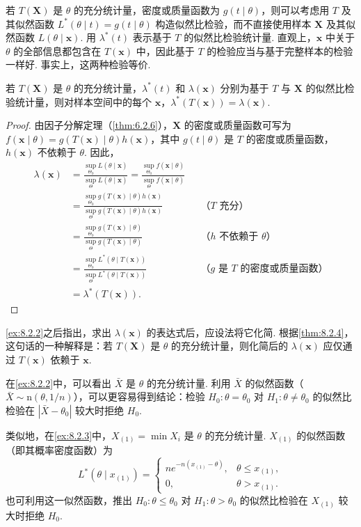 若 $T(\boldsymbol X)$ 是 $\theta$ 的充分统计量，密度或质量函数为 $g(t\mid\theta)$，则可以考虑用 $T$ 及其似然函数 $L^*(\theta\mid t)=g(t\mid\theta)$ 构造似然比检验，而不直接使用样本 $\boldsymbol X$ 及其似然函数 $L(\theta\mid\boldsymbol x)$. 用 $\lambda^*(t)$ 表示基于 $T$ 的似然比检验统计量. 直观上，$\boldsymbol x$ 中关于 $\theta$ 的全部信息都包含在 $T(\boldsymbol x)$ 中，因此基于 $T$ 的检验应当与基于完整样本的检验一样好. 事实上，这两种检验等价.
\begin{theorem}\label{thm:8.2.4}
若 $T(\boldsymbol X)$ 是 $\theta$ 的充分统计量，$\lambda^*(t)$ 和 $\lambda(\boldsymbol x)$ 分别为基于 $T$ 与 $\boldsymbol X$ 的似然比检验统计量，则对样本空间中的每个 $\boldsymbol x$，$\lambda^*(T(\boldsymbol x))=\lambda(\boldsymbol x)$.
\end{theorem}
\begin{proof}
由因子分解定理（\autoref{thm:6.2.6}），$\boldsymbol X$ 的密度或质量函数可写为 $f(\boldsymbol x\mid\theta)=g(T(\boldsymbol x)\mid\theta)h(\boldsymbol x)$，其中 $g(t\mid\theta)$ 是 $T$ 的密度或质量函数，$h(\boldsymbol x)$ 不依赖于 $\theta$. 因此，
$$\begin{aligned}
\lambda(\boldsymbol x)&=\frac{\sup_{\Theta_0}L(\theta\mid\boldsymbol x)}{\sup_\Theta L(\theta\mid\boldsymbol x)}
=\frac{\sup_{\Theta_0}f(\boldsymbol x\mid\theta)}{\sup_\Theta f(\boldsymbol x\mid\theta)}\\
&=\frac{\sup_{\Theta_0}g(T(\boldsymbol x)\mid\theta)h(\boldsymbol x)}{\sup_\Theta g(T(\boldsymbol x)\mid\theta)h(\boldsymbol x)}&&\text{（$T$ 充分）}\\
&=\frac{\sup_{\Theta_0}g(T(\boldsymbol x)\mid\theta)}{\sup_\Theta g(T(\boldsymbol x)\mid\theta)}&&\text{（$h$ 不依赖于 $\theta$）}\\
&=\frac{\sup_{\Theta_0}L^*(\theta\mid T(\boldsymbol x))}{\sup_\Theta L^*(\theta\mid T(\boldsymbol x))}&&\text{（$g$ 是 $T$ 的密度或质量函数）}\\
&=\lambda^*(T(\boldsymbol x)).
\end{aligned}$$
\end{proof}
\autoref{ex:8.2.2}之后指出，求出 $\lambda(\boldsymbol x)$ 的表达式后，应设法将它化简. 根据\autoref{thm:8.2.4}，这句话的一种解释是：若 $T(\boldsymbol X)$ 是 $\theta$ 的充分统计量，则化简后的 $\lambda(\boldsymbol x)$ 应仅通过 $T(\boldsymbol x)$ 依赖于 $\boldsymbol x$.
\begin{example}[似然比检验与充分性]\label{ex:8.2.5}
在\autoref{ex:8.2.2}中，可以看出 $\bar X$ 是 $\theta$ 的充分统计量. 利用 $\bar X$ 的似然函数（$\bar X\sim\mathrm n(\theta,1/n)$），可以更容易得到结论：检验 $H_0:\theta=\theta_0$ 对 $H_1:\theta\ne\theta_0$ 的似然比检验在 $|\bar X-\theta_0|$ 较大时拒绝 $H_0$.

类似地，在\autoref{ex:8.2.3}中，$X_{(1)}=\min X_i$ 是 $\theta$ 的充分统计量. $X_{(1)}$ 的似然函数（即其概率密度函数）为
$$L^*(\theta\mid x_{(1)})=\begin{cases}ne^{-n(x_{(1)}-\theta)},&\theta\le x_{(1)},\\0,&\theta>x_{(1)}.\end{cases}$$
也可利用这一似然函数，推出 $H_0:\theta\le\theta_0$ 对 $H_1:\theta>\theta_0$ 的似然比检验在 $X_{(1)}$ 较大时拒绝 $H_0$.
\end{example}

